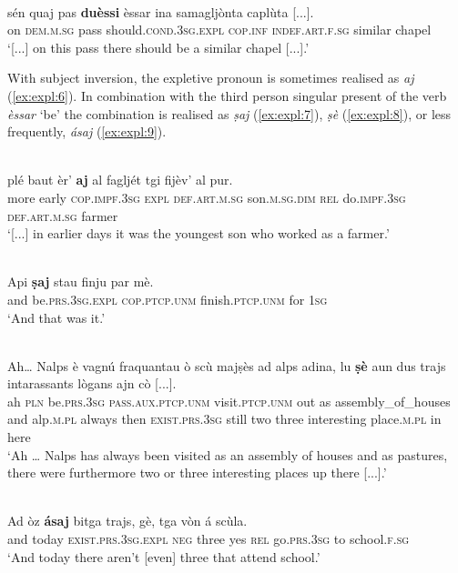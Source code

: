 \ea\label{ex:expl:5}
\\ 
\gll  [...] sén quaj pas \textbf{duèssi} èssar ina samagljònta caplùta [...].\\
{} on \textsc{dem.m.sg} pass should.\textsc{cond.3sg.expl} \textsc{cop.inf} \textsc{indef.art.f.sg} similar chapel\\
\glt `[...] on this pass there should be a similar chapel [...].'
\z

With subject inversion, the expletive pronoun is sometimes realised as \textit{aj} (\ref{ex:expl:6}). In combination with the third person singular present of the verb \textit{èssar} `be' the combination is realised as \textit{ṣaj} (\ref{ex:expl:7}), \textit{ṣè} (\ref{ex:expl:8}), or less frequently, \textit{ásaj} (\ref{ex:expl:9}).

\ea\label{ex:expl:6}
\\ 
\gll  [...] plé baut èr’ \textbf{aj} al fagljét tgi fijèv’ al pur.  \\
{} more early \textsc{cop.impf.3sg} \textsc{expl} \textsc{def.art.m.sg}  son.\textsc{m.sg.dim} \textsc{rel} do.\textsc{impf.3sg} \textsc{def.art.m.sg} farmer \\
\glt `[...] in earlier days it was the youngest son who worked as a farmer.'
\z

\ea
\label{ex:expl:7}
\\ 
\gll  Api \textbf{ṣaj} stau finju par mè.\\
and be.\textsc{prs.3sg.expl} \textsc{cop.ptcp.unm} finish.\textsc{ptcp.unm} for \textsc{1sg}\\
\glt `And that was it.'
\z

\ea
\label{ex:expl:8}
\\
\gll Ah… Nalps è vagnú fraquantau ò scù majṣès ad alps adina, lu \textbf{ṣè} aun dus trajs intarassants lògans ajn cò [...].\\
ah  \textsc{pln}  be.\textsc{prs.3sg} \textsc{pass.aux.ptcp.unm} visit.\textsc{ptcp.unm} out as assembly\_of\_houses and alp.\textsc{m.pl} always then \textsc{exist.prs.3sg} still two three interesting place.\textsc{m.pl} in here \\
\glt `Ah … Nalps has always been visited as an assembly of houses and as pastures, there were furthermore two or three interesting places up there [...].'
\z

\ea
\label{ex:expl:9}
\\
\gll    Ad òz \textbf{ásaj} bitga trajs, gè, tga vòn á scùla.\\
and today \textsc{exist.prs.3sg.expl} \textsc{neg} three yes \textsc{rel} go.\textsc{prs.3sg} to school.\textsc{f.sg}\\
\glt `And today there aren’t [even] three that attend school.'
\z


